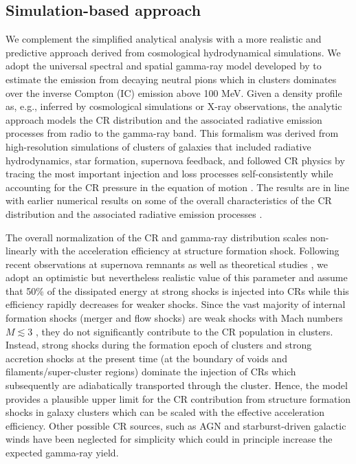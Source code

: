 \documentclass[12pt,manuscript]{aastex}
\begin{document}
\subsection{Simulation-based approach}
We complement the simplified analytical analysis with a more realistic and predictive approach
derived from cosmological hydrodynamical simulations. We adopt the universal spectral and spatial
gamma-ray model developed by \citet{article:PinzkePfrommer:2010} to estimate the emission from
decaying neutral pions which in clusters dominates over the inverse Compton (IC) emission above
100 MeV. Given a density profile as, e.g., inferred by
cosmological simulations or X-ray observations, the analytic approach models the CR distribution and
the associated radiative emission processes from radio to the gamma-ray band. This formalism was
derived from high-resolution simulations of clusters of galaxies that included radiative hydrodynamics,
star formation, supernova feedback, and followed CR physics by tracing the most important injection
and loss processes self-consistently while accounting for the CR pressure in the equation of motion
\citep{article:PfrommerSpringelEnsslinJubelgas, article:EnsslinPfrommerSpringelJubelgas:2007,
  article:JubelgasSpringelEnsslinPfrommer:2008}. The results are in line with earlier numerical
results on some of the overall characteristics of the CR distribution and the associated radiative
emission processes \citep{article:DolagEnsslin:2000, article:MiniatiRyuKangJones:2001,
  article:Miniati:2003, article:Pfrommer_etal:2007, article:PfrommerEnsslinSpringel:2008,
  article:Pfrommer:2008}.
 
The overall normalization of the CR and gamma-ray distribution scales non-linearly with the
acceleration efficiency at structure formation shock. Following recent observations at
supernova remnants \citep{article:Helder_etal:2009} as well as theoretical studies
\citep{article:KangJones:2005}, we adopt an optimistic but nevertheless realistic value of this
parameter and assume that 50\% of the dissipated energy at strong shocks is injected into CRs while
this efficiency rapidly decreases for weaker shocks. Since the vast majority of internal formation
shocks (merger and flow shocks) are weak shocks with Mach numbers $M\lesssim3$
\citep[e.g.,][]{article:Ryu_etal:2003}, they do not significantly contribute to the CR population in
clusters. Instead, strong shocks during the formation epoch of clusters and strong accretion shocks
at the present time (at the boundary of voids and filaments/super-cluster regions) dominate the
injection of CRs which subsequently are adiabatically transported through the cluster. Hence, the model
provides a plausible upper limit for the CR contribution from structure formation shocks
in galaxy clusters which can be scaled with the effective acceleration efficiency. Other possible CR
sources, such as AGN and starburst-driven galactic winds have been neglected for simplicity which
could in principle increase the expected gamma-ray yield.
\end{document}
